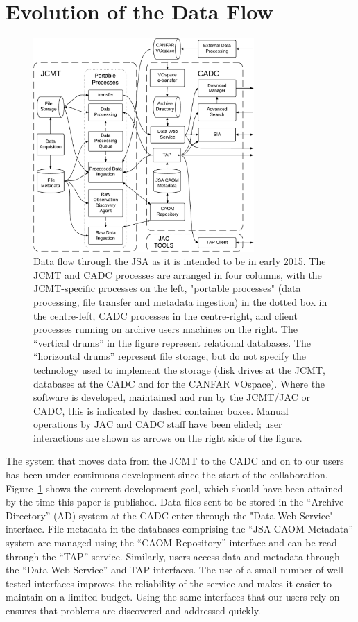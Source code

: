 \documentclass[final,authoryear,5p,times,twocolumn]{elsarticle}
\begin{document}
\section{Evolution of the Data Flow}

\begin{figure}[!ht]
\begin{center}
\includegraphics[width=0.75\textwidth]{jsa_dataflow_2015}
\end{center}
\caption{Data flow through the JSA as it is intended to be in early 2015.  The JCMT and CADC processes are arranged in four columns, with the JCMT-specific processes on the left, "portable processes" (data processing, file transfer and metadata ingestion) in the dotted box in the centre-left, CADC processes in the centre-right, and client processes running on archive users machines on the right.  The ``vertical drums'' in the figure represent relational databases.  The ``horizontal drums'' represent file storage, but do not specify the technology used to implement the storage (disk drives at the JCMT, databases at the CADC and for the CANFAR VOspace).  Where the software is developed, maintained and run by the JCMT/JAC or CADC, this is indicated by dashed container boxes.     Manual operations by JAC and CADC staff have been elided; user interactions are shown as arrows on the right side of the figure.}
\label{fig:jsadataflow}
\end{figure}

The system that moves data from the JCMT to the CADC and on to our users has been under continuous development since the start of the collaboration.  Figure~\ref{fig:jsadataflow} shows the current development goal, which should have been attained by the time this paper is published.  Data files sent to be stored in the ``Archive Directory'' (AD) system at the CADC enter through the "Data Web Service" interface.  File metadata in the databases comprising the ``JSA CAOM Metadata'' system are managed using the ``CAOM Repository'' interface and can be read through the ``TAP'' service.  Similarly, users access data and metadata through the ``Data Web Service'' and TAP interfaces.  The use of a small number of well tested interfaces improves the reliability of the service and makes it easier to maintain on a limited budget.   Using the same interfaces that our users rely on ensures that problems are discovered and addressed quickly.
\end{document}
